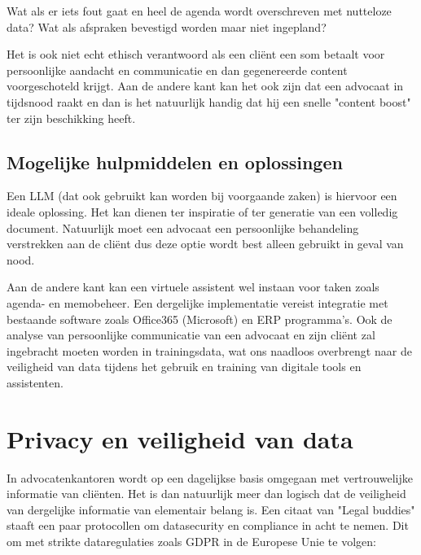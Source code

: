 Wat als er iets fout gaat en heel de agenda wordt overschreven met nutteloze data?
Wat als afspraken bevestigd worden maar niet ingepland?

Het is ook niet echt ethisch verantwoord als een cliënt een som betaalt voor persoonlijke aandacht en communicatie en dan gegenereerde content voorgeschoteld krijgt.
Aan de andere kant kan het ook zijn dat een advocaat in tijdsnood raakt en dan is het natuurlijk handig dat hij een snelle "content boost" ter zijn beschikking heeft.

\subsection{Mogelijke hulpmiddelen en oplossingen}
Een LLM (dat ook gebruikt kan worden bij voorgaande zaken) is hiervoor een ideale oplossing.
Het kan dienen ter inspiratie of ter generatie van een volledig document.
Natuurlijk moet een advocaat een persoonlijke behandeling verstrekken aan de cliënt dus deze optie wordt best alleen gebruikt in geval van nood.

Aan de andere kant kan een virtuele assistent wel instaan voor taken zoals agenda- en memobeheer.
Een dergelijke implementatie vereist integratie met bestaande software zoals Office365 (Microsoft) en ERP programma's.
Ook de analyse van persoonlijke communicatie van een advocaat en zijn cliënt zal ingebracht moeten worden in trainingsdata,
wat ons naadloos overbrengt naar de veiligheid van data tijdens het gebruik en training van digitale tools en assistenten.

\section{Privacy en veiligheid  van data}
In advocatenkantoren wordt op een dagelijkse basis omgegaan met vertrouwelijke informatie van cliënten.
Het is dan natuurlijk meer dan logisch dat de veiligheid van dergelijke informatie van elementair belang is.
Een citaat van "Legal buddies" staaft een paar protocollen om datasecurity en compliance in acht te nemen.
Dit om met strikte dataregulaties zoals GDPR in de Europese Unie te volgen:

